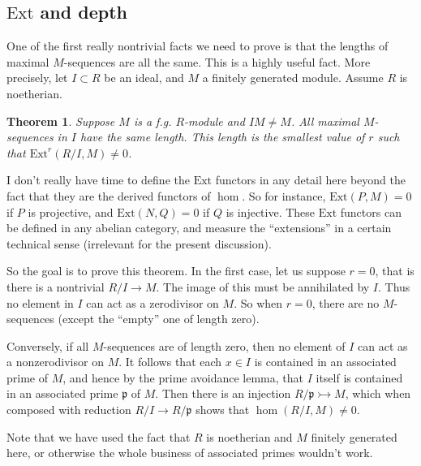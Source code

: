 \documentclass{article}
\newtheorem{theorem}{Theorem}
\begin{document}
\newcommand{\ext}{\mathrm{Ext}}

\newcommand{\ass}{\mathrm{Ass}}
\subsection{$\mathrm{Ext}$ and depth}
One of the first really nontrivial facts we need to prove is that the lengths
of maximal $M$-sequences are all the same. This is a highly useful fact.
More precisely, let $I \subset R$ be an ideal, and $M$ a finitely generated
module. Assume $R$ is noetherian.

\begin{theorem} Suppose $M$ is a f.g. $R$-module and $IM \neq M$.
All maximal $M$-sequences in $I$ have the same length. This length is the
smallest value of $r$ such that $\mathrm{Ext}^r(R/I, M) \neq 0$.
\end{theorem} 

I don't really have time to define the $\mathrm{Ext}$ functors in any detail here
beyond the fact that they are the derived functors of $\hom$. So for instance,
$\mathrm{Ext}(P, M)=0$ if $P$ is projective, and $\mathrm{Ext}(N, Q) = 0$ if $Q$ is injective.
These $\mathrm{Ext}$ functors can be defined in any abelian category, and measure the
``extensions'' in a certain technical sense (irrelevant for the present
discussion).


So the goal is to prove this theorem. 
In the first case, let us suppose $r = 0$, that is there is a nontrivial $R/I
\to M$. The image of this must be annihilated by $I$. Thus no element in $I$
can act as a zerodivisor on $M$. So when $r = 0$, there are no $M$-sequences
(except the ``empty'' one of length zero). 

Conversely, if all $M$-sequences are
of length zero, then no element of $I$ can act as a nonzerodivisor on $M$. It
follows that each $x \in I$ is contained in an associated prime of $M$, and
hence by the prime avoidance lemma, that $I$ itself is contained in an
associated prime $\mathfrak{p}$ of $M$. Then there is an injection
$R/\mathfrak{p} \rightarrowtail  M$, which when composed with reduction $R/I
\to R/\mathfrak{p}$ shows that $\hom(R/I, M) \neq 0$.

Note that we have used the fact that $R$ is noetherian and $M$ finitely
generated here, or otherwise the whole business of associated primes wouldn't
work.
\end{document}
